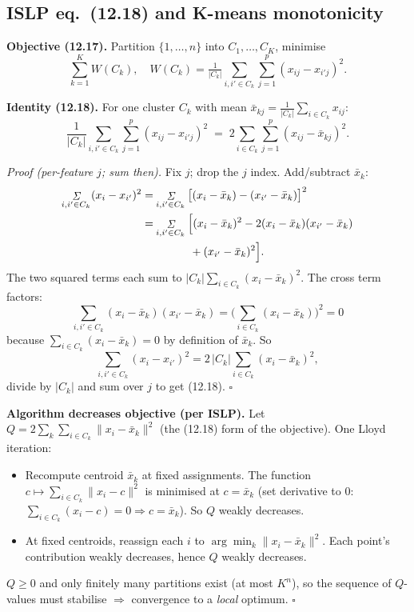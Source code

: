 \subsection{ISLP eq.\ (12.18) and K-means monotonicity}

\textbf{Objective (12.17).} Partition $\{1,\dots,n\}$ into $C_1,\dots,C_K$, minimise
\[
\sum_{k=1}^{K} W(C_k),\quad W(C_k)=\tfrac{1}{|C_k|}\sum_{i,i'\in C_k}\sum_{j=1}^{p}(x_{ij}-x_{i'j})^2.
\]

\textbf{Identity (12.18).} For one cluster $C_k$ with mean $\bar x_{kj}=\tfrac{1}{|C_k|}\sum_{i\in C_k}x_{ij}$:
\[
\frac{1}{|C_k|}\sum_{i,i'\in C_k}\sum_{j=1}^{p}(x_{ij}-x_{i'j})^2 \;=\; 2\sum_{i\in C_k}\sum_{j=1}^{p}(x_{ij}-\bar x_{kj})^2.
\]

\emph{Proof (per-feature $j$; sum then).} Fix $j$; drop the $j$ index. Add/subtract $\bar x_k$:
\begin{align*}
\sum_{i,i'\in C_k}(x_i-x_{i'})^2
&= \sum_{i,i'\in C_k}\big[(x_i-\bar x_k)-(x_{i'}-\bar x_k)\big]^2\\
&= \sum_{i,i'\in C_k}\Big[(x_i-\bar x_k)^2-2(x_i-\bar x_k)(x_{i'}-\bar x_k)\\
&\hphantom{= \sum_{i,i'\in C_k}\Big[}+(x_{i'}-\bar x_k)^2\Big].
\end{align*}
The two squared terms each sum to $|C_k|\sum_{i\in C_k}(x_i-\bar x_k)^2$. The cross term factors:
\[
\sum_{i,i'\in C_k}(x_i-\bar x_k)(x_{i'}-\bar x_k)
=\Big(\!\sum_{i\in C_k}(x_i-\bar x_k)\!\Big)^{\!2}=0
\]
because $\sum_{i\in C_k}(x_i-\bar x_k)=0$ by definition of $\bar x_k$. So
\[
\sum_{i,i'\in C_k}(x_i-x_{i'})^2 = 2\,|C_k|\sum_{i\in C_k}(x_i-\bar x_k)^2,
\]
divide by $|C_k|$ and sum over $j$ to get (12.18). $\square$

\textbf{Algorithm decreases objective (per ISLP).} Let $Q=2\sum_k\sum_{i\in C_k}\|x_i-\bar x_k\|^2$ (the (12.18) form of the objective). One Lloyd iteration:
\begin{itemize}
\item[\textbf{2(a)}] Recompute centroid $\bar x_k$ at fixed assignments. The function $c\mapsto\sum_{i\in C_k}\|x_i-c\|^2$ is minimised at $c=\bar x_k$ (set derivative to $0$: $\sum_{i\in C_k}(x_i-c)=0\Rightarrow c=\bar x_k$). So $Q$ weakly decreases.
\item[\textbf{2(b)}] At fixed centroids, reassign each $i$ to $\arg\min_k\|x_i-\bar x_k\|^2$. Each point's contribution weakly decreases, hence $Q$ weakly decreases.
\end{itemize}
$Q\ge 0$ and only finitely many partitions exist (at most $K^n$), so the sequence of $Q$-values must stabilise $\Rightarrow$ convergence to a \emph{local} optimum. $\square$

